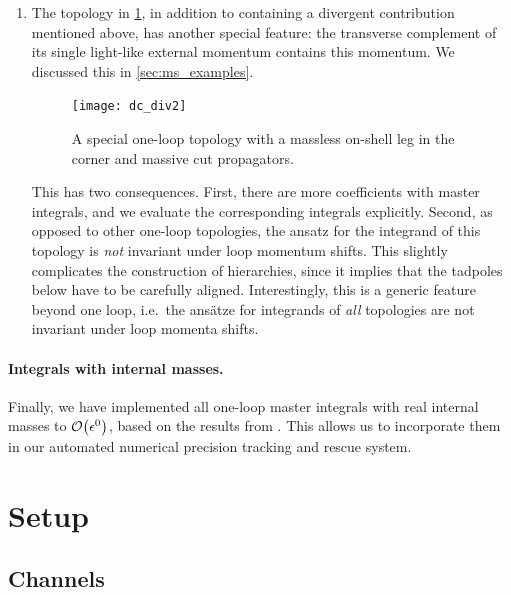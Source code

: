 \begin{enumerate}
  \item The topology in \cref{fig:dc_div2}, in addition to containing a divergent contribution mentioned above,
    has another special feature: the transverse complement of its single light-like external momentum contains this momentum.
    We discussed this in \cref{sec:ms_examples}.
    \begin{figure}[h]
      \centering
      \texttt{[image: dc\_div2]}
      \caption{A special one-loop topology with a massless on-shell leg in the corner and massive cut propagators.}
      \label{fig:dc_div2}
    \end{figure}
    This has two consequences. First, there are more coefficients with master integrals, and we evaluate the corresponding integrals explicitly.
    Second, as opposed to other one-loop topologies, the ansatz for the integrand of this topology is \emph{not} invariant under loop momentum shifts.
    This slightly complicates the construction of hierarchies, since it implies that the tadpoles below have to be carefully aligned.
    Interestingly, this is a generic feature beyond one loop, i.e.\ the ansätze for integrands of \emph{all} topologies are not invariant under loop momenta shifts.
\end{enumerate}


\paragraph{Integrals with internal masses.} Finally,
we have implemented all one-loop master integrals with real internal masses to $\order{\epsilon^0} $, based
on the results from \cite{Carrazza:2016gav,vanHameren:2010cp}. This allows us to incorporate
them in our automated numerical precision tracking and rescue system.


\section{Setup}
\label{sec:wbb:setup}

\subsection{Channels}
\label{sec:calcsetup}

